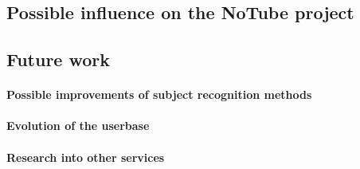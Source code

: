 \subsection{Possible influence on the NoTube project}

\subsection{Future work}

\paragraph{Possible improvements of subject recognition methods}
\paragraph{Evolution of the userbase}
\paragraph{Research into other services}

